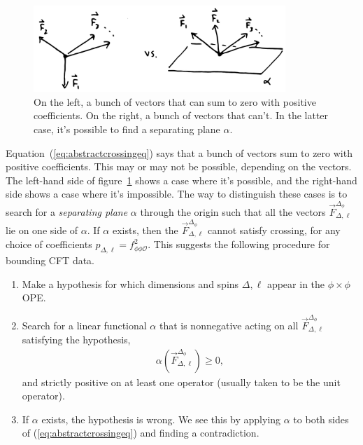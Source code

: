 \documentclass[11pt]{ws-rv9x6}
\newcommand\be{\begin{eqnarray}}
\newcommand\ee{\end{eqnarray}}
\newcommand\f\phi
\newcommand\cO{\mathcal{O}}
\newcommand\<\langle
\renewcommand\>\rangle
\renewcommand\.{\cdot}
\newcommand\x\times
\newcommand\De{\Delta}
\renewcommand\a\alpha
\begin{document}
\begin{figure}
\begin{center}
\includegraphics[width=0.85\textwidth]{vectorpossibilities.jpg}
\end{center}
\caption{On the left, a bunch of vectors that can sum to zero with positive coefficients.  On the right, a bunch of vectors that can't.  In the latter case, it's possible to find a separating plane $\a$.\label{fig:vectorpossibilities}}
\end{figure}

Equation~(\ref{eq:abstractcrossingeq}) says that a bunch of vectors sum to zero with positive coefficients.  This may or may not be possible, depending on the vectors.  The left-hand side of figure~\ref{fig:vectorpossibilities} shows a case where it's possible, and the right-hand side shows a case where it's impossible.  The way to distinguish these cases is to search for a {\it separating plane} $\alpha$ through the origin such that all the vectors $\vec{F}_{\De,\ell}^{\De_\f}$ lie on one side of $\alpha$.  If $\alpha$ exists, then the  $\vec{F}_{\De,\ell}^{\De_\f}$ cannot satisfy crossing, for any choice of coefficients $p_{\De,\ell}=f_{\f\f\cO}^2$.  This suggests the following procedure for bounding CFT data.

\begin{algorithm}
\label{thealgorithm}
\qquad

\begin{enumerate}
\item Make a hypothesis for which dimensions and spins $\De,\ell$ appear in the $\f\x\f$ OPE.
\item Search for a linear functional $\alpha$ that is nonnegative acting on all $\vec F_{\Delta,\ell}^{\Delta_\f}$ satisfying the hypothesis,
\be
\alpha(\vec F_{\Delta,\ell}^{\De_\f})\geq 0,
\ee
and strictly positive on at least one operator (usually taken to be the unit operator).
\item If $\alpha$ exists, the hypothesis is wrong.  We see this by applying $\alpha$ to both sides of (\ref{eq:abstractcrossingeq}) and finding a contradiction.
\end{enumerate}
\end{algorithm}
\end{document}
